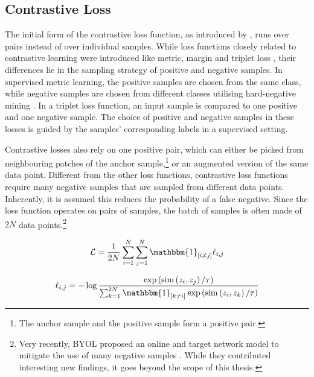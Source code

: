 \subsection{Contrastive Loss}
The initial form of the contrastive loss function, as introduced by \cite{contrastiveloss}, runs over pairs instead of over individual samples.
While loss functions closely related to contrastive learning were introduced like metric, margin and triplet loss \cite{8014803, marginloss, chechik_large_2009}, their differences lie in the sampling strategy of positive and negative samples.
In supervised metric learning, the positive samples are chosen from the same class, while negative samples are chosen from different classes utilising hard-negative mining \cite{8014803}.
In a triplet loss function, an input sample is compared to one positive and one negative sample.
The choice of positive and negative samples in these losses is guided by the samples' corresponding labels in a supervised setting.


Contrastive losses also rely on one positive pair, which can either be picked from neighbouring patches of the anchor sample,\footnote{The anchor sample and the positive sample form a positive pair.} or an augmented version of the same data point.
Different from the other loss functions, contrastive loss functions require many negative samples that are sampled from different data points.
Inherently, it is assumed this reduces the probability of a false negative.
Since the loss function operates on pairs of samples, the batch of samples is often made of $2N$ data points.\footnote{Very recently, BYOL proposed an online and target network model to mitigate the use of many negative samples \cite{Grill2020BootstrapYO}.
While they contributed interesting new findings, it goes beyond the scope of this thesis.}


\begin{equation}
    \mathcal{L} = \frac{1}{2N}\sum_{i=1}^{N}\sum_{j=1}^{N} \mathbbm{1}_{[i\neq j]}\ell_{i, j}
    \label{eq:total_loss_function}
\end{equation}


\begin{equation}
    \ell_{i, j}=-\log \frac{\exp \left(\operatorname{sim}\left(z_{i}, z_{j}\right) / \tau\right)}{\sum_{k=1}^{2 N} \mathbbm{1}_{[k \neq i]} \exp \left(\operatorname{sim}\left(z_{i}, z_{k}\right) / \tau\right)}
    \label{eq:loss_function}
\end{equation}

